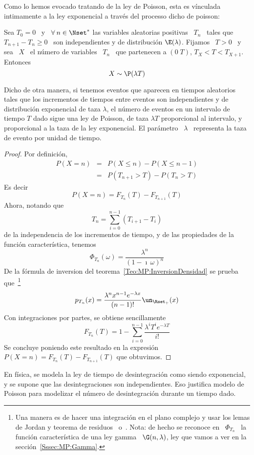 Como  lo hemos  evocado  tratando de  la  ley de  Poisson,  esta es  v\'inculada
intimamente a la ley exponencial a trav\'es del processo dicho de poisson:
%
\begin{lema}
\label{Lem:MP:VinculoExponencialPoisson}
%
  Sea  $T_0 =  0$ \  y \  $\forall \:  n \in  \Nset^*$ las  variables aleatorias
  positivas \ $T_n$ \ tales que $T_{n+1}  - T_n \ge 0$ \ son independientes y de
  distribuci\'on $\E(\lambda)$. Fijamos \ $T > 0$ \ y sea \ $X$ \ el n\'umero de
  variables  \  $T_n$  \  que  partenecen  a   $(0  \;  T)$,  \ie  $T_X  <  T  <
  T_{X+1}$. Entonces
  \[
  X \sim \P(\lambda T)
  \]
\end{lema}
%
Dicho  de otra manera,  si tenemos  eventos que  aparecen en  tiempos aleatorios
tales  que los  incrementos de  tiempos entre  eventos son  independientes  y de
distribuci\'on  exponencial de  taza $\lambda$,  el  n\'umero de  eventos en  un
intervalo  de tiempo $T$  dado sigue  una ley  de Poisson,  de taza  $\lambda T$
proporcional al  intervalo, y proporcional a  la taza de la  ley exponencial. El
par\'ametro \ $\lambda$ \ representa la taza de evento por unidad de tiempo.
%
\begin{proof}
Por definici\'on,
%
\begin{eqnarray*}
P(X = n) & = & P(X\le n) - P(X \le n-1) \\[2mm]
%
& = & P(T_{n+1} > T) - P(T_n > T)
\end{eqnarray*}
%
Es decir
%
\[
P(X = n) = F_{T_n}(T) - F_{T_{n+1}}(T)
\]
%
Ahora, notando que
%
\[
T_n = \sum_{i=0}^{n-1} \left( T_{i+1} - T_i \right)
\]
%
de la  independencia de los  incrementos de tiempo,  y de las propiedades  de la
funci\'on caracter\'istica, tenemos
%
\[
\Phi_{T_n}(\omega) = \frac{\lambda^n}{(1-\imath \, \omega)^n}
\]
%
De  la  f\'ormula  de  inversion del  teorema~\ref{Teo:MP:InversionDensidad}  se
prueba  que~\footnote{Una manera  es  de  hacer una  integraci\'on  en el  plano
  complejo  y usar  los lemas  de Jordan  y teorema  de residuos~\cite{CarKro05}
  o~\cite[Cap.~4]{AblFok03}.  Nota: de hecho se  reconoce en \ $\Phi_{T_n}$ \ la
  funci\'on caracter\'istica de una ley gamma \ $\G(n,\lambda)$, ley que vamos a
  ver en la secci\'on~\ref{Sssec:MP:Gamma}.}
%
\[
p_{T_n}(x) = \frac{\lambda^n x^{n-1} e^{-\lambda x}}{(n-1)!} \un_{\Rset_+}(x)
\]
%
Con integraciones por partes, se obtiene sencillamente
%
\[
F_{T_n}(T) = 1 - \sum_{i=0}^{n-1} \frac{\lambda^i T^i e^{-\lambda T}}{i!}
\]
%
Se concluye poniendo  este resultado en la expresi\'on $P(X =  n) = F_{T_n}(T) -
F_{T_{n+1}}(T)$ que obtuvimos.
\end{proof}
%
En  f\'isica,  se  modela la  ley  de  tiempo  de desintegraci\'on  como  siendo
exponencial,  y  se supone  que  las  desintegraciones  son independientes.  Eso
justifica  modelo de  Poisson  para modelizar  el  n\'umero de  desintegraci\'on
durante un tiempo dado.

